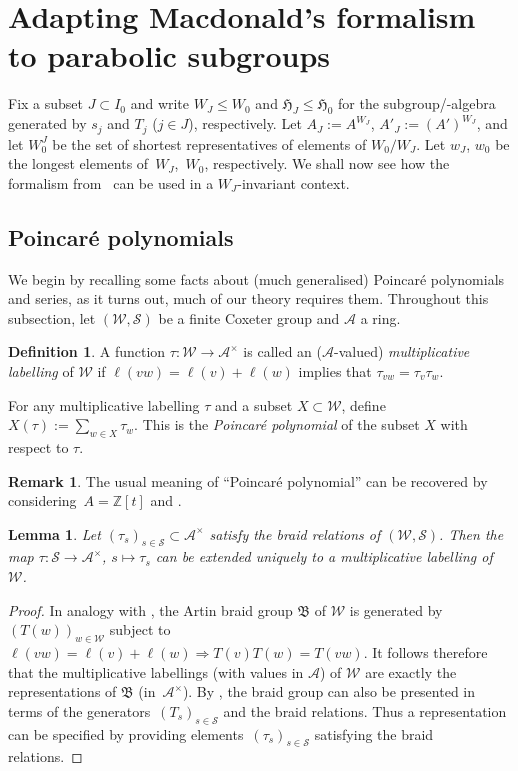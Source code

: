 \documentclass[pdftex]{sigma}
\newtheorem{Lemma}[Theorem]{Lemma}
\theoremstyle{definition}
\newtheorem{Definition}[Theorem]{Definition}
\newtheorem{Remark}[Theorem]{Remark}
\numberwithin{equation}{section}
\begin{document}
\section{Adapting Macdonald's formalism to parabolic subgroups}\label{sec:macdo-parabolic}
Fix a subset $J\subset I_0$ and write $W_J\le W_0$ and $\mathfrak{H}_J\le\mathfrak{H}_0$ for
the subgroup/-algebra generated by $s_j$ and $T_j$ ($j\in J$), respectively. Let
$A_J := A^{W_J}$, $A'_J:= (A')^{W_J}$, and let $W_0^J$ be the set of shortest representatives of elements of $W_0/W_J$. Let
$w_J$, $w_0$ be the longest elements of~$W_J$,~$W_0$, respectively. We shall now
see how the formalism from~\cite{macdonald} can be used in a $W_J$-invariant
context.

\subsection{Poincar\'e polynomials}
We begin by recalling some facts about (much generalised) Poincar\'e
polynomials and series, as it turns out, much of our theory requires them.
Throughout this subsection, let $(\mathcal{W},\mathcal{S})$ be a finite Coxeter group and
$\mathcal{A}$ a ring.

\begin{Definition}
 A function
 $\tau\colon \mathcal{W}\to \mathcal{A}^\times$ is called
 an ($\mathcal{A}$-valued) \emph{multiplicative labelling} of $\mathcal{W}$ if $\ell(vw)=\ell(v)+\ell(w)$ implies that
 $\tau_{vw}=\tau_v\tau_w$.

 For any multiplicative labelling $\tau$ and a subset $X\subset \mathcal{W}$, define
$
 X(\tau) := \sum_{w\in X} \tau_w$.
 This is the \emph{Poincar\'e polynomial} of the subset $X$ with respect to $\tau$.
\end{Definition}

\begin{Remark}
 The usual meaning of ``Poincar\'e polynomial'' can be recovered by
 considering~${A=\mathbb{Z}[t]}$ and .
\end{Remark}

\begin{Lemma}\label{sec:lem-construct-labelling}
 Let $(\tau_s)_{s\in \mathcal{S}}\subset \mathcal{A}^\times$ satisfy the braid relations of $(\mathcal{W},\mathcal{S})$.
Then the map $\tau\colon \mathcal{S}\to \mathcal{A}^\times$, $s\mapsto \tau_s$ can be extended
 uniquely to a multiplicative labelling of~$\mathcal{W}$.
\end{Lemma}
\begin{proof}
 In analogy with \cite[Section~3.1]{macdonald}, the Artin braid group
 $\mathfrak{B}$ of $\mathcal{W}$ is generated by $(T(w))_{w\in \mathcal{W}}$ subject to
$
 \ell(vw)=\ell(v)+\ell(w)\Rightarrow T(v)T(w)=T(vw)$.
 It follows therefore that the multiplicative labellings (with values in
 $\mathcal{A}$) of $\mathcal{W}$ are exactly the representations of
 $\mathfrak{B}$ (in~$\mathcal{A}^\times$). By
 \cite[Section~3.1.6]{macdonald}, the braid group can also be
 presented in terms of the generators~$(T_s)_{s\in \mathcal{S}}$ and the braid
 relations. Thus a representation can be specified by providing
 elements~$(\tau_s)_{s\in\mathcal{S}}$ satisfying the braid relations.
\end{proof}
\end{document}
